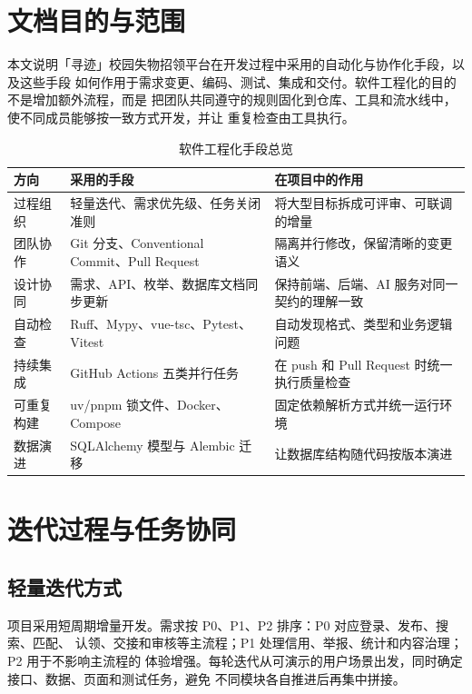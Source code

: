 \section{文档目的与范围}

本文说明「寻迹」校园失物招领平台在开发过程中采用的自动化与协作化手段，以及这些手段
如何作用于需求变更、编码、测试、集成和交付。软件工程化的目的不是增加额外流程，而是
把团队共同遵守的规则固化到仓库、工具和流水线中，使不同成员能够按一致方式开发，并让
重复检查由工具执行。

\begin{table}[H]
  \centering
  \caption{软件工程化手段总览}
  \begin{tabularx}{\textwidth}{L{2.8cm}L{4.1cm}Y}
    \toprule
    方向 & 采用的手段 & 在项目中的作用 \\
    \midrule
    过程组织 & 轻量迭代、需求优先级、任务关闭准则 & 将大型目标拆成可评审、可联调的增量 \\
    团队协作 & Git 分支、Conventional Commit、Pull Request & 隔离并行修改，保留清晰的变更语义 \\
    设计协同 & 需求、API、枚举、数据库文档同步更新 & 保持前端、后端、AI 服务对同一契约的理解一致 \\
    自动检查 & Ruff、Mypy、vue-tsc、Pytest、Vitest & 自动发现格式、类型和业务逻辑问题 \\
    持续集成 & GitHub Actions 五类并行任务 & 在 push 和 Pull Request 时统一执行质量检查 \\
    可重复构建 & uv/pnpm 锁文件、Docker、Compose & 固定依赖解析方式并统一运行环境 \\
    数据演进 & SQLAlchemy 模型与 Alembic 迁移 & 让数据库结构随代码按版本演进 \\
    \bottomrule
  \end{tabularx}
\end{table}

\section{迭代过程与任务协同}

\subsection{轻量迭代方式}

项目采用短周期增量开发。需求按 P0、P1、P2 排序：P0 对应登录、发布、搜索、匹配、
认领、交接和审核等主流程；P1 处理信用、举报、统计和内容治理；P2 用于不影响主流程的
体验增强。每轮迭代从可演示的用户场景出发，同时确定接口、数据、页面和测试任务，避免
不同模块各自推进后再集中拼接。

